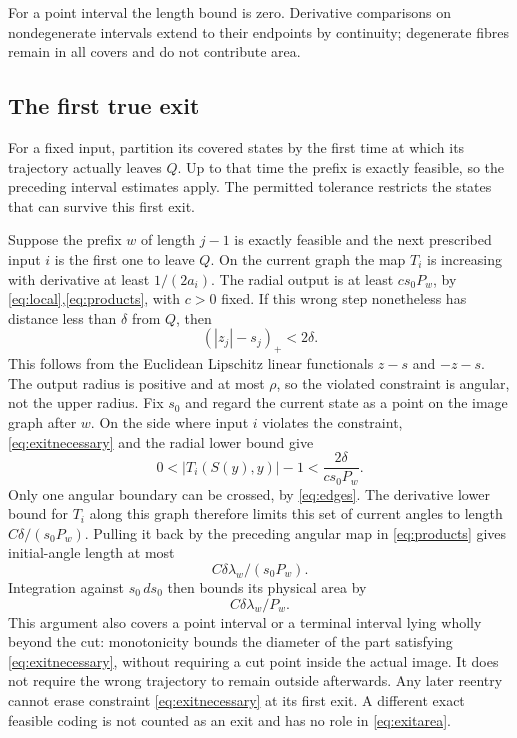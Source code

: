 \documentclass[11pt]{amsart}
\theoremstyle{definition}
\theoremstyle{remark}
\numberwithin{equation}{section}
\begin{document}
For a point interval the length bound is zero. Derivative comparisons
on nondegenerate intervals extend to their endpoints by continuity;
degenerate fibres remain in all covers and do not contribute area.
\subsection{The first true exit}
For a fixed input, partition its covered states by the first time
at which its trajectory actually leaves $Q$. Up to that time the
prefix is exactly feasible, so the preceding interval estimates apply.
The permitted tolerance restricts the states that can survive this
first exit.

Suppose the prefix \(w\) of length \(j-1\) is exactly feasible and
the next prescribed input \(i\) is the first one to leave $Q$.
On the current graph the map \(T_i\) is increasing with derivative
at least \(1/(2a_i)\). The radial output is at least
\(c s_0P_w\), by \eqref{eq:local},\eqref{eq:products}, with \(c>0\) fixed.
If this wrong step nonetheless has distance less than \(\delta\)
from $Q$, then
\begin{equation}
(|z_j|-s_j)_+<2\delta.                    \label{eq:exitnecessary}
\end{equation}
This follows from the Euclidean Lipschitz linear functionals
\(z-s\) and \(-z-s\). The output radius is positive and at most
\(\rho\), so the violated constraint is angular, not the upper radius.
Fix $s_0$ and regard the current state as a point on the image
graph after $w$. On the side where input $i$ violates the constraint,
\eqref{eq:exitnecessary} and the radial lower bound give
\[
0<|T_i(S(y),y)|-1<\frac{2\delta}{c s_0P_w}.
\]
Only one angular boundary can be crossed, by \eqref{eq:edges}.
The derivative lower bound for $T_i$ along this graph therefore
limits this set of current angles to length
$C\delta/(s_0P_w)$. Pulling it back by the preceding angular map
in \eqref{eq:products} gives initial-angle length at most
\[
                         C\delta\lambda_w/(s_0P_w).
\]
Integration against \(s_0\,ds_0\) then bounds its physical area by
\begin{equation}
C\delta\lambda_w/P_w.     \label{eq:exitarea}
\end{equation}
This argument also covers a point interval or a terminal interval
lying wholly beyond the cut: monotonicity bounds the diameter of
the part satisfying \eqref{eq:exitnecessary}, without requiring a cut point inside the
actual image. It does not require the wrong trajectory to remain
outside afterwards. Any later reentry cannot erase constraint \eqref{eq:exitnecessary}
at its first exit. A different exact feasible coding is not counted
as an exit and has no role in \eqref{eq:exitarea}.
\end{document}
